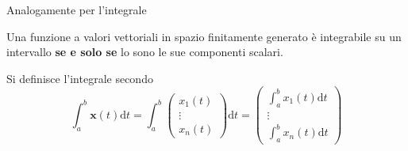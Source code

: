\documentclass[10pt, oneside]{book}
\theoremstyle{plain}
\begin{document}
Analogamente per l'integrale
\begin{prop}
Una funzione a valori vettoriali in spazio finitamente generato è integrabile su un intervallo \textbf{se e solo se} lo sono le sue componenti scalari.
\end{prop}
Si definisce l'integrale secondo
\[\int_{a}^{b}\mathbf{x}(t)\textrm{d}t = \int_{a}^{b}\begin{pmatrix}
x_1(t)\\
\vdots\\
x_n(t)
\end{pmatrix}\textrm{d}t = \begin{pmatrix}
\int_{a}^{b}x_1(t)\textrm{d}t\\
\vdots\\
\int_{a}^{b}x_n(t)\textrm{d}t
\end{pmatrix}\]
\end{document}
